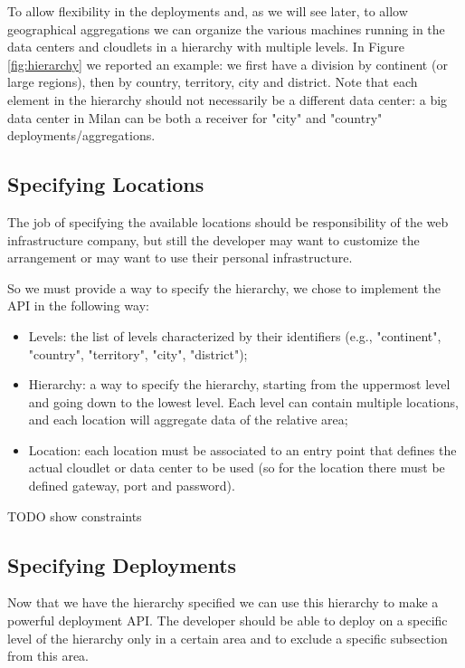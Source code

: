 To allow flexibility in the deployments and, as we will see later, to allow geographical aggregations we can organize the various machines running in the data centers and cloudlets in a hierarchy with multiple levels.
In Figure \ref{fig:hierarchy} we reported an example: we first have a division by continent (or large regions), then by country, territory, city and district.
Note that each element in the hierarchy should not necessarily be a different data center: a big data center in Milan can be both a receiver for "city" and "country" deployments/aggregations.
\vspace{0.5cm}


\subsection{Specifying Locations}
The job of specifying the available locations should be responsibility of the web infrastructure company, but still the developer may want to customize the arrangement or may want to use their personal infrastructure. 

So we must provide a way to specify the hierarchy, we chose to implement the API in the following way:
\begin{itemize}
    \item Levels: the list of levels characterized by their identifiers (e.g., "continent", "country", "territory", "city", "district");
    \item Hierarchy: a way to specify the hierarchy, starting from the uppermost level and going down to the lowest level. Each level can contain multiple locations, and each location will aggregate data of the relative area;
    \item Location: each location must be associated to an entry point that defines the actual cloudlet or data center to be used (so for the location there must be defined gateway, port and password).
\end{itemize}

TODO show constraints


\subsection{Specifying Deployments}
Now that we have the hierarchy specified we can use this hierarchy to make a powerful deployment API. The developer should be able to deploy on a specific level of the hierarchy only in a certain area and to exclude a specific subsection from this area.

